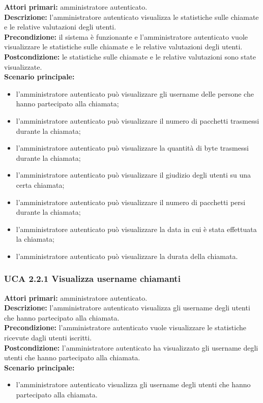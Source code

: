 \noindent 
\textbf{Attori primari:} amministratore autenticato.\\
\textbf{Descrizione:} l'amministratore autenticato visualizza le statistiche sulle chiamate e le relative valutazioni degli utenti.\\
\textbf{Precondizione:} il sistema è funzionante e l'amministratore autenticato vuole visualizzare le statistiche sulle chiamate e le relative valutazioni degli utenti.\\
\textbf{Postcondizione:} le statistiche sulle chiamate e le relative valutazioni sono state visualizzate.\\
\textbf{Scenario principale:}
\begin{itemize}
\item l'amministratore autenticato può visualizzare gli username delle persone che hanno partecipato alla chiamata;
\item l'amministratore autenticato può visualizzare il numero di pacchetti trasmessi durante la chiamata;
\item l'amministratore autenticato può visualizzare la quantità di byte trasmessi durante la chiamata;
\item l'amministratore autenticato può visualizzare il giudizio degli utenti su una certa chiamata;
\item l'amministratore autenticato può visualizzare il numero di pacchetti persi durante la chiamata;
\item l'amministratore autenticato può visualizzare la data in cui è stata effettuata la chiamata;
\item l'amministratore autenticato può visualizzare la durata della chiamata.
\end{itemize}

\subsubsection{UCA 2.2.1 Visualizza username chiamanti}
\noindent 
\textbf{Attori primari:} amministratore autenticato.\\
\textbf{Descrizione:} l'amministratore autenticato visualizza gli username degli utenti che hanno partecipato alla chiamata.\\
\textbf{Precondizione:} l'amministratore autenticato vuole visualizzare le statistiche ricevute dagli utenti iscritti.\\
\textbf{Postcondizione:} l'amministratore autenticato ha visualizzato gli username degli utenti che hanno partecipato alla chiamata.\\
\textbf{Scenario principale:}
\begin{itemize}
\item l'amministratore autenticato visualizza gli username degli utenti che hanno partecipato alla chiamata.
\end{itemize}

